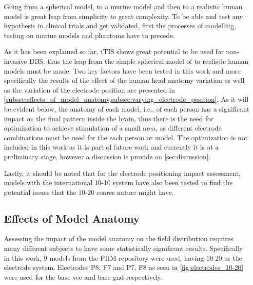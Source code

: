 Going from a spherical model, to a murine model and then to a realistic human model is great leap from simplicity to great complexity. To be able and test any hypothesis in clinical trials and get validated, first the processes of modelling, testing on murine models and phantoms have to precede.

As it has been explained so far, \gls{tTIS} shows great potential to be used for non-invasive \gls{DBS}, thus the leap from the simple spherical model of  to realistic human models must be made. Two key factors have been tested in this work and more specifically the results of the effect of the human head anatomy variation as well as the variation of the electrode position are presented in \cref{subsec:effects_of_model_anatomy,subsec:varying_electrode_position}. As it will be evident below, the anatomy of each model, i.e., of each person has a significant impact on the final pattern inside the brain, thus there is the need for optimization to achieve stimulation of a small area, as different electrode combinations must be used for the each person or model. The optimization is not included in this work as it is part of future work and currently it is at a preliminary stage, however a discussion is provide on \autoref{sec:discussion}.

Lastly, it should be noted that for the electrode positioning impact assessment, models with the international 10-10 system have also been tested to find the potential issues that the 10-20 coarse nature might have.

\subsection{Effects of Model Anatomy}
\label{subsec:effects_of_model_anatomy}

Assessing the impact of the model anatomy on the field distribution requires many different subjects to have some statistically significant results. Specifically in this work, 9 models from the \gls{PHM} repository \cite{ErikG.Lee2016} were used, having 10-20 as the electrode system. Electrodes P8, F7 and P7, F8 as seen in \autoref{fig:electrodes_10-20} were used for the base vcc and base gnd respectively.


